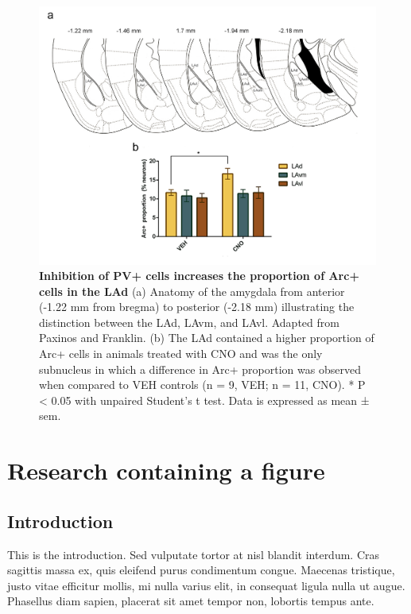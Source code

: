 \documentclass[12pt,a4paper,]{report}
\begin{document}
\begin{figure}[htbp]
\centering
\includegraphics{source/figures/figure_5.jpg}
\caption{\textbf{Inhibition of PV+ cells increases the proportion of
Arc+ cells in the LAd} (a) Anatomy of the amygdala from anterior (-1.22
mm from bregma) to posterior (-2.18 mm) illustrating the distinction
between the LAd, LAvm, and LAvl. Adapted from Paxinos and Franklin. (b)
The LAd contained a higher proportion of Arc+ cells in animals treated
with CNO and was the only subnucleus in which a difference in Arc+
proportion was observed when compared to VEH controls (n = 9, VEH; n =
11, CNO). * P \textless{} 0.05 with unpaired Student's t test. Data is
expressed as mean ± sem. \label{ref_a_figure}}
\end{figure}

\chapter{Research containing a
figure}\label{research-containing-a-figure}

\section{Introduction}\label{introduction-3}

This is the introduction. Sed vulputate tortor at nisl blandit interdum.
Cras sagittis massa ex, quis eleifend purus condimentum congue. Maecenas
tristique, justo vitae efficitur mollis, mi nulla varius elit, in
consequat ligula nulla ut augue. Phasellus diam sapien, placerat sit
amet tempor non, lobortis tempus ante.
\end{document}

